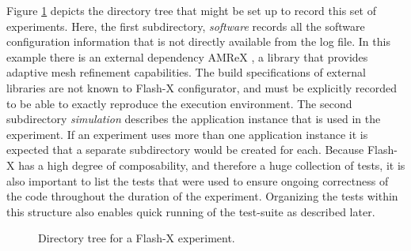 \documentclass{IEEEcsmag}
\begin{document}
Figure \ref{fig:dirtree} depicts the directory tree that might be set up to record this set of experiments. Here, the first subdirectory, {\em software} records all the software configuration information that is not directly available from the log file. In this example there is an external dependency AMReX \cite{AMReX_JOSS}, a library that provides adaptive mesh refinement capabilities. The build specifications of external libraries are not known to Flash-X configurator, and must be explicitly recorded to be able to exactly reproduce the execution environment. The second subdirectory {\em simulation} describes the application instance that is used in the experiment. If an experiment uses more than one application instance it is expected that a separate subdirectory would be created for each. Because Flash-X has a high degree of composability, and therefore a huge collection of tests, it is also important to list the tests that were used to ensure ongoing correctness of the code throughout the duration of the experiment. Organizing the tests within this structure also enables quick running of the test-suite as described later. 
%
\begin{figure}
\caption{Directory tree for a Flash-X experiment.}
\label{fig:dirtree}
\end{figure}
%
\end{document}
